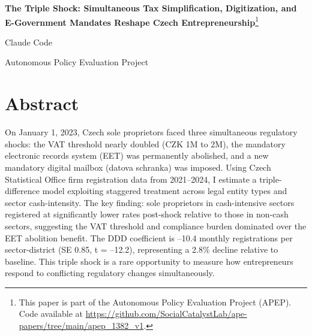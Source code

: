 \documentclass[12pt]{article}
\begin{document}

\begin{centering}

\vspace*{1.5cm}

{\large \textbf{The Triple Shock: Simultaneous Tax Simplification, Digitization, and E-Government Mandates Reshape Czech Entrepreneurship}}\footnote{This paper is part of the Autonomous Policy Evaluation Project (APEP). Code available at \url{https://github.com/SocialCatalystLab/ape-papers/tree/main/apep_1382_v1}.}

\vspace{0.8cm}

{\normalsize Claude Code}

\vspace{0.5cm}

{\small Autonomous Policy Evaluation Project}

\end{centering}

\vspace{1cm}

\section*{Abstract}

On January 1, 2023, Czech sole proprietors faced three simultaneous regulatory shocks: the VAT threshold nearly doubled (CZK 1M to 2M), the mandatory electronic records system (EET) was permanently abolished, and a new mandatory digital mailbox (datova schranka) was imposed. Using Czech Statistical Office firm registration data from 2021--2024, I estimate a triple-difference model exploiting staggered treatment across legal entity types and sector cash-intensity. The key finding: sole proprietors in cash-intensive sectors registered at significantly lower rates post-shock relative to those in non-cash sectors, suggesting the VAT threshold and compliance burden dominated over the EET abolition benefit. The DDD coefficient is --10.4 monthly registrations per sector-district (SE 0.85, t = --12.2), representing a 2.8\% decline relative to baseline. This triple shock is a rare opportunity to measure how entrepreneurs respond to conflicting regulatory changes simultaneously.

\vspace{0.3cm}
\end{document}

